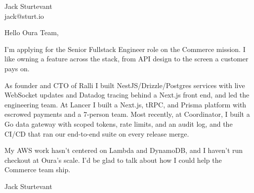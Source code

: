 \documentclass[11pt]{article}
\begin{document}
\raggedright

{\namefont\fontsize{20pt}{24pt}\selectfont Jack Sturtevant}\\[-0.3em]
jack@sturt.io

\vspace{1.2em}

Hello Oura Team,

I'm applying for the Senior Fullstack Engineer role on the Commerce mission. I like owning a feature across the stack, from API design to the screen a customer pays on.

As founder and CTO of Ralli I built NestJS/Drizzle/Postgres services with live WebSocket updates and Datadog tracing behind a Next.js front end, and led the engineering team. At Lancer I built a Next.js, tRPC, and Prisma platform with escrowed payments and a 7-person team. Most recently, at Coordinator, I built a Go data gateway with scoped tokens, rate limits, and an audit log, and the CI/CD that ran our end-to-end suite on every release merge.

My AWS work hasn't centered on Lambda and DynamoDB, and I haven't run checkout at Oura's scale. I'd be glad to talk about how I could help the Commerce team ship.

\vspace{0.6em}
Jack Sturtevant
\end{document}
